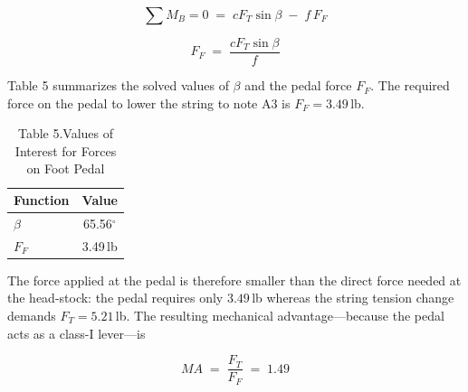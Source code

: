 \documentclass[12pt]{article}
\theoremstyle{definition} %
\theoremstyle{plain} %
\begin{document}
\begin{equation}
  \sum M_B = 0
  \;=\;
  cF_T\sin\beta \;-\; f\,F_F
  \tag{28}
\end{equation}

\begin{equation}
  F_F
  \;=\;
  \frac{cF_T\sin\beta}{f}
  \tag{29}
\end{equation}

Table 5 summarizes the solved values of $\beta$ and the pedal force $F_F$.
The required force on the pedal to lower the string to note A3 is
$F_F = 3.49$\,lb.

\begin{table}[ht]
\centering
\caption*{Table 5.\;Values of Interest for Forces on Foot Pedal}
\begin{tabular}{|l|c|}
\hline
\textbf{Function} & \textbf{Value} \\ \hline
$\beta$ & 65.56$^\circ$ \\ \hline
$F_F$   & 3.49\,lb \\ \hline
\end{tabular}
\end{table}

The force applied at the pedal is therefore smaller than the direct force
needed at the head-stock: the pedal requires only $3.49$\,lb whereas the
string tension change demands $F_T = 5.21$\,lb.  
The resulting mechanical advantage—because the pedal acts as a class-I
lever—is

\begin{equation}
  MA \;=\; \frac{F_T}{F_F} \;=\; 1.49
  \tag{30}
\end{equation}
\end{document}
